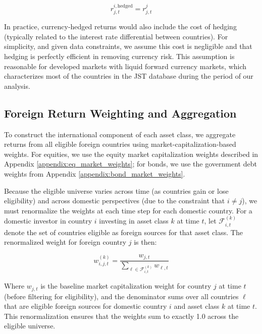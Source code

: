 \documentclass[11pt]{article}
\begin{document}
\begin{equation}\label{eq:hedged_return}
  r^{i,\text{hedged}}_{j,t} = r^{j}_{j,t}
\end{equation}

In practice, currency-hedged returns would also include the cost of hedging (typically related to the interest rate differential between countries). For simplicity, and given data constraints, we assume this cost is negligible and that hedging is perfectly efficient in removing currency risk. This assumption is reasonable for developed markets with liquid forward currency markets, which characterizes most of the countries in the JST database during the period of our analysis.

\subsection{Foreign Return Weighting and Aggregation}

To construct the international component of each asset class, we aggregate returns from all eligible foreign countries using market-capitalization-based weights. For equities, we use the equity market capitalization weights described in Appendix \ref{appendix:eq_market_weights}; for bonds, we use the government debt weights from Appendix \ref{appendix:bond_market_weights}.

Because the eligible universe varies across time (as countries gain or lose eligibility) and across domestic perspectives (due to the constraint that $i \neq j$), we must renormalize the weights at each time step for each domestic country. For a domestic investor in country $i$ investing in asset class $k$ at time $t$, let $\mathcal{F}^{(k)}_{i,t}$ denote the set of countries eligible as foreign sources for that asset class. The renormalized weight for foreign country $j$ is then:

\begin{equation}\label{eq:renormalized_weights}
  w^{(k)}_{i,j,t} = \frac{w_{j,t}}{\sum_{\ell \in \mathcal{F}^{(k)}_{i,t}} w_{\ell,t}}
\end{equation}

Where $w_{j,t}$ is the baseline market capitalization weight for country $j$ at time $t$ (before filtering for eligibility), and the denominator sums over all countries $\ell$ that are eligible foreign sources for domestic country $i$ and asset class $k$ at time $t$. This renormalization ensures that the weights sum to exactly 1.0 across the eligible universe.
\end{document}
